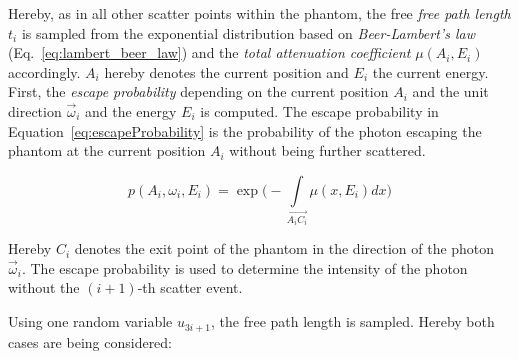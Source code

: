 Hereby, as in all other scatter points within the phantom, the free \emph{free
path length} $t_i$ is sampled from the exponential distribution based on
\emph{Beer-Lambert's law} (Eq.~\ref{eq:lambert_beer_law}) and the \emph{total
attenuation coefficient} $\mu(A_i, E_i)$ accordingly. $A_i$ hereby denotes the
current position and $E_i$ the current energy. First, the \emph{escape
probability} depending on the current position $A_i$ and the unit direction
$\vec{\omega}_i$ and the energy $E_i$ is computed. The escape probability in
Equation~\ref{eq:escapeProbability} is the probability of the photon escaping
the phantom at the current position $A_i$ without being further scattered.

\begin{equation}
    \label{eq:escapeProbability}
    p(A_i, \omega_i, E_i) = \exp\bigg(-\int\limits_{\overrightarrow{A_iC_i}} \mu(x, E_i) dx\bigg)
\end{equation}

Hereby $C_i$ denotes the exit point of the phantom in the direction of the photon $\vec{\omega}_i$. The escape probability is used to determine the intensity of the photon without the $(i+1)$-th scatter event.

Using one random variable $u_{3i+1}$, the free path length is sampled. Hereby both cases are being considered:

